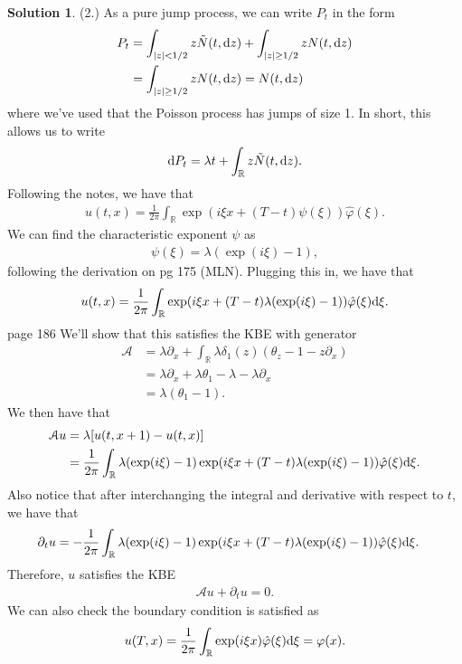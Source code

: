 \documentclass[12pt]{article}
\newcommand{\bbR}{\mathbb{R}}
\newcommand{\abs}[1]{ \left| #1 \right| }
\renewcommand{\phi}{\varphi}
\theoremstyle{definition}
\newtheorem{sol}{Solution}
\theoremstyle{remark}
\def\d{{\rm d}}
\begin{document}
\begin{sol}
    (2.) As a pure jump process, we can write $P_{t}$ in the form
    \begin{align*}
        P_{t} &= \int_{\abs{z} < 1 / 2} z \tilde{N}(t, \d z) + \int_{\abs{z} \geq 1 / 2} z N(t, \d z)\\
              &= \int_{\abs{z} \geq 1 / 2} z N(t, \d z) = N(t, \d z)\\
    \end{align*}
    where we've used that the Poisson process has jumps of size 1. In short, this allows us to write
    \begin{align*}
        \d P_{t} = \lambda t + \int_{\bbR}z \tilde{N}(t, \d z).
    \end{align*}
    Following the notes, we have that
    \begin{align*}
        u(t, x) = \frac{1}{2\pi} \int_{\bbR} \exp(i \xi x + (T-t)\psi(\xi)) \hat{\phi}(\xi).
    \end{align*}
   We can find the characteristic exponent $\psi$ as
    \begin{align*}
        \psi(\xi) =  \lambda (\exp(i\xi) - 1),
    \end{align*}
    following the derivation on pg 175 (MLN). Plugging this in, we have that
    \begin{align*}
        u(t, x) = \frac{1}{2\pi} \int_{\bbR} \exp(i \xi x + (T-t)\lambda (\exp(i\xi) - 1)) \hat{\phi}(\xi) \d \xi.
    \end{align*}
    page 186
    We'll show that this satisfies the KBE with generator
    \begin{align*}
        \mathcal{A} &= \lambda \partial_{x} + \int_{\bbR} \lambda \delta_{1}(z)(\theta_{z} - 1 - z \partial_{x})\\
                    &= \lambda \partial_{x} + \lambda \theta_{1} - \lambda - \lambda \partial_{x}\\
                    &= \lambda (\theta_{1} - 1).
    \end{align*}
    We then have that
    \begin{align*}
        \mathcal{A} u &= \lambda [u(t, x + 1) - u(t, x)]\\
                      &= \frac{1}{2\pi} \int_{\bbR} \lambda (\exp(i\xi) - 1)\exp(i \xi x + (T-t)\lambda (\exp(i\xi) - 1)) \hat{\phi}(\xi) \d \xi.
    \end{align*}
    Also notice that after interchanging the integral and derivative with respect to $t$, we have that
    \begin{align*}
        \partial_{t} u &= - \frac{1}{2\pi}\int_{\bbR}  \lambda (\exp(i\xi) - 1)\exp(i \xi x + (T-t)\lambda (\exp(i\xi) - 1)) \hat{\phi}(\xi) \d \xi.
    \end{align*}
    Therefore, $u$ satisfies the KBE
    \begin{align*}
     \mathcal{A} u +  \partial_{t}  u = 0.
    \end{align*}
    We can also check the boundary condition is satisfied as
    \begin{align*}
        u(T, x) = \frac{1}{2\pi} \int_{\bbR} \exp(i \xi x ) \hat{\phi}(\xi) \d \xi = \phi(x).
    \end{align*}
\end{sol}
\end{document}
